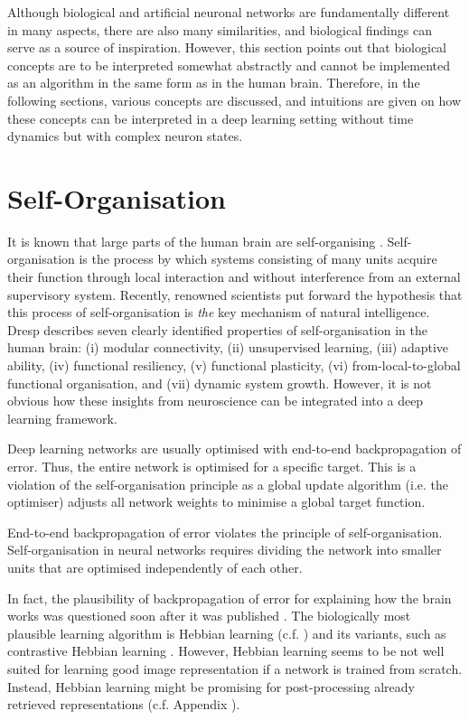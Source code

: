 Although biological and artificial neuronal networks are fundamentally different in many aspects, there are also many similarities, and biological findings can serve as a source of inspiration. However, this section points out that biological concepts are to be interpreted somewhat abstractly and cannot be implemented as an algorithm in the same form as in the human brain. Therefore, in the following sections, various concepts are discussed, and intuitions are given on how these concepts can be interpreted in a deep learning setting without time dynamics but with complex neuron states.

\section{Self-Organisation}
It is known that large parts of the human brain are self-organising .
Self-organisation is the process by which systems consisting of many units acquire their function through local interaction and without interference from an external supervisory system.
Recently, renowned scientists  put forward the hypothesis that this process of self-organisation is \emph{the} key mechanism of natural intelligence.
Dresp  describes seven clearly identified properties of self-organisation in the human brain: (i) modular connectivity, (ii) unsupervised learning, (iii) adaptive ability, (iv) functional resiliency, (v) functional plasticity, (vi) from-local-to-global functional organisation, and (vii) dynamic system growth.
However, it is not obvious how these insights from neuroscience can be integrated into a deep learning framework.

Deep learning networks are usually optimised with end-to-end backpropagation of error.
Thus, the entire network is optimised for a specific target.
This is a violation of the self-organisation principle as a global update algorithm (i.e. the optimiser) adjusts all network weights to minimise a global target function.


\begin{claim}
	End-to-end backpropagation of error violates the principle of self-organisation. Self-organisation in neural networks requires dividing the network into smaller units that are optimised independently of each other.
\end{claim}

In fact, the plausibility of backpropagation of error for explaining how the brain works was questioned soon after it was published .
The biologically most plausible learning algorithm is Hebbian learning (c.f. ) and its variants, such as contrastive Hebbian learning .
However, Hebbian learning seems to be not well suited for learning good image representation if a network is trained from scratch. Instead, Hebbian learning might be promising for post-processing already retrieved representations (c.f. Appendix ).

